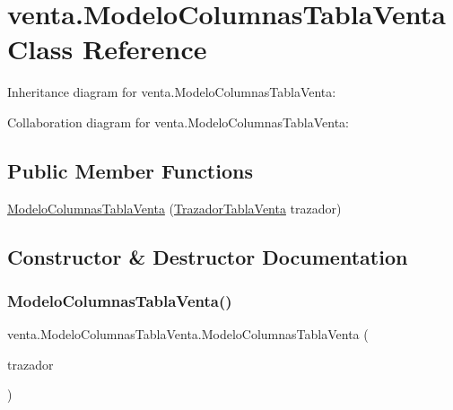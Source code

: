 \hypertarget{classventa_1_1_modelo_columnas_tabla_venta}{}\section{venta.\+Modelo\+Columnas\+Tabla\+Venta Class Reference}
\label{classventa_1_1_modelo_columnas_tabla_venta}


Inheritance diagram for venta.\+Modelo\+Columnas\+Tabla\+Venta\+:


Collaboration diagram for venta.\+Modelo\+Columnas\+Tabla\+Venta\+:
\subsection*{Public Member Functions}
\begin{DoxyCompactItemize}
\item 
\mbox{\hyperlink{classventa_1_1_modelo_columnas_tabla_venta_a0986adbdf24aba2fa5f42812c1ea23af}{Modelo\+Columnas\+Tabla\+Venta}} (\mbox{\hyperlink{classventa_1_1_trazador_tabla_venta}{Trazador\+Tabla\+Venta}} trazador)
\end{DoxyCompactItemize}


\subsection{Constructor \& Destructor Documentation}
\mbox{\label{classventa_1_1_modelo_columnas_tabla_venta_a0986adbdf24aba2fa5f42812c1ea23af}} 
\subsubsection{\texorpdfstring{Modelo\+Columnas\+Tabla\+Venta()}{ModeloColumnasTablaVenta()}}
{\footnotesize\ttfamily venta.\+Modelo\+Columnas\+Tabla\+Venta.\+Modelo\+Columnas\+Tabla\+Venta (\begin{DoxyParamCaption}\item[{\mbox{\hyperlink{classventa_1_1_trazador_tabla_venta}{Trazador\+Tabla\+Venta}}}]{trazador }\end{DoxyParamCaption})\hspace{0.3cm}{\ttfamily [inline]}}

